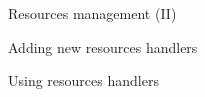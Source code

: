 \documentclass[10pt,compress]{beamer} %
\begin{document}
\begin{frame}{Resources management (II)}
	\begin{exampleblock}{Adding new resources handlers}
	
	\end{exampleblock}

	\begin{exampleblock}{Using resources handlers}
	
	\end{exampleblock}
\end{frame}
\end{document}
